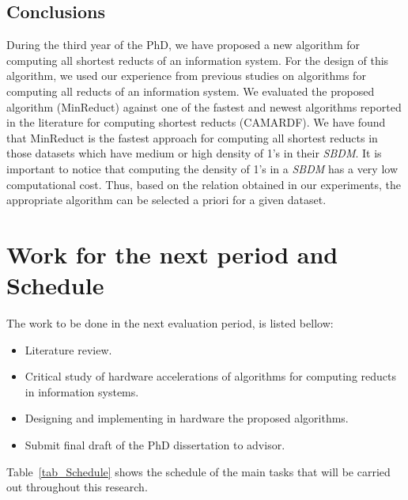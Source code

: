 \documentclass[authoryear,11pt]{elsarticle}
\begin{document}
\subsection{Conclusions} 

  During the third year of the PhD, we have proposed a new algorithm for computing all shortest reducts of an information system. For the design of this algorithm, we used our experience from previous studies on algorithms for computing all reducts of an information system. We evaluated the proposed algorithm (MinReduct) against one of the fastest and newest algorithms reported in the literature for computing shortest reducts (CAMARDF). We have found that MinReduct  is the fastest approach for computing all shortest reducts in those datasets which have medium or high density of 1's in their \textit{SBDM}. It is important to notice that computing the density of 1's in a \textit{SBDM} has a very low computational cost. Thus, based on the relation obtained in our experiments, the appropriate algorithm can be selected a priori for a given dataset.

\section{Work for the next period and Schedule}\label{sec_schedule}
  The work to be done in the next evaluation period, is listed bellow:
  
  \begin{itemize}
  	\itemsep0em 
  	\item Literature review.
  	\item Critical study of hardware accelerations of algorithms for computing reducts in information systems.
  	\item Designing and implementing in hardware the proposed algorithms.
  	\item Submit final draft of the PhD dissertation to advisor.
  \end{itemize}
  
  Table~\ref{tab_Schedule} shows the schedule of the main tasks that will be carried out throughout this research. 
  
\end{document}
